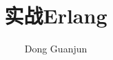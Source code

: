 \documentclass[a4paper, 11pt]{book}
\begin{document}
\title{实战Erlang}
\author{Dong Guanjun}
\maketitle
\tableofcontents





\appendix



\newpage
\end{document}
